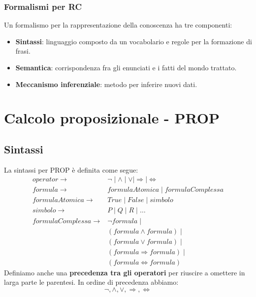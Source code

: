 \subsubsection{Formalismi per RC}
Un formalismo per la rappresentazione della conoscenza ha tre componenti:
\begin{itemize}
	\item \textbf{Sintassi}: linguaggio composto da un vocabolario e regole per la formazione di frasi.
	\item \textbf{Semantica}: corrispondenza fra gli enunciati e i fatti del mondo trattato.
	\item \textbf{Meccanismo inferenziale}: metodo per inferire nuovi dati.
\end{itemize}

\section{Calcolo proposizionale - PROP}
\subsection{Sintassi}
La sintassi per PROP \`e definita come segue:
\[
	\begin{array}{rl}
		operator \rightarrow         & \lnot \mid \wedge \mid \vee \mid \Rightarrow \mid \Leftrightarrow \\
		formula \rightarrow          & formulaAtomica \mid formulaComplessa                              \\
		formulaAtomica \rightarrow   & True \mid False \mid simbolo                                      \\
		simbolo \rightarrow          & P \mid Q \mid R \mid \dots                                        \\
		formulaComplessa \rightarrow & \lnot formula \mid                                                \\
		                             & (formula \wedge formula) \mid                                     \\
		                             & (formula \vee formula) \mid                                       \\
		                             & (formula \Rightarrow formula) \mid                                \\
		                             & (formula \Leftrightarrow formula)
	\end{array}
\]
Definiamo anche una \textbf{precedenza tra gli operatori} per riuscire a omettere in larga parte le parentesi. In ordine di precedenza
abbiamo:
\[ \lnot, \wedge, \vee, \Rightarrow, \Leftrightarrow \]

